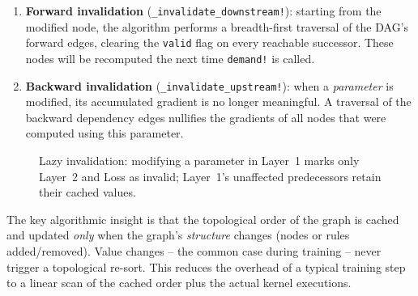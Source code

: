 \documentclass{article}
\begin{document}
\begin{enumerate}
  \item \textbf{Forward invalidation} (\texttt{\_invalidate\_downstream!}): starting from the modified node, the algorithm performs a breadth-first traversal of the DAG's forward edges, clearing the \texttt{valid} flag on every reachable successor. These nodes will be recomputed the next time \texttt{demand!} is called.
  \item \textbf{Backward invalidation} (\texttt{\_invalidate\_upstream!}): when a \emph{parameter} is modified, its accumulated gradient is no longer meaningful. A traversal of the backward dependency edges nullifies the gradients of all nodes that were computed using this parameter.
\end{enumerate}

\begin{figure}[H]
\centering
{}
\caption{Lazy invalidation: modifying a parameter in Layer~1 marks only Layer~2 and Loss as invalid; Layer~1's unaffected predecessors retain their cached values.}
\label{fig:lazy_detail}
\end{figure}

The key algorithmic insight is that the topological order of the graph is cached and updated \emph{only} when the graph's \emph{structure} changes (nodes or rules added/removed). Value changes -- the common case during training -- never trigger a topological re-sort. This reduces the overhead of a typical training step to a linear scan of the cached order plus the actual kernel executions.
\end{document}
